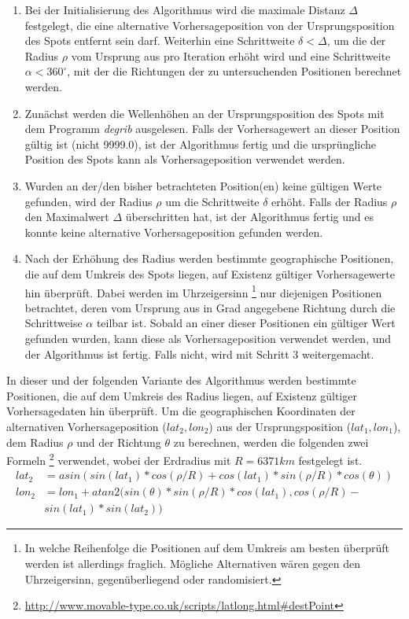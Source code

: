 \begin{enumerate}

\item Bei der Initialisierung des Algorithmus wird die maximale
  Distanz $\Delta$ festgelegt, die eine alternative Vorhersageposition
  von der Ursprungsposition des Spots entfernt sein darf. Weiterhin
  eine Schrittweite $\delta < \Delta$, um die der Radius $\rho$ vom
  Ursprung aus pro Iteration erhöht wird und eine Schrittweite $\alpha
  < 360^{\circ}$, mit der die Richtungen der zu untersuchenden
  Positionen berechnet werden.

\item Zunächst werden die Wellenhöhen an der Ursprungsposition des
  Spots mit dem Programm \textit{degrib} ausgelesen. Falls der
  Vorhersagewert an dieser Position gültig ist (nicht 9999.0), ist der
  Algorithmus fertig und die ursprüngliche Position des Spots kann als
  Vorhersageposition verwendet werden.

\item Wurden an der/den bisher betrachteten Position(en) keine
  gültigen Werte gefunden, wird der Radius $\rho$ um die Schrittweite
  $\delta$ erhöht. Falls der Radius $\rho$ den Maximalwert $\Delta$
  überschritten hat, ist der Algorithmus fertig und es konnte keine
  alternative Vorhersageposition gefunden werden.

\item Nach der Erhöhung des Radius werden bestimmte geographische
  Positionen, die auf dem Umkreis des Spots liegen, auf Existenz
  gültiger Vorhersagewerte hin überprüft. Dabei werden im
  Uhrzeigersinn \footnote{In welche Reihenfolge die Positionen auf dem
    Umkreis am besten überprüft werden ist allerdings
    fraglich. Mögliche Alternativen wären gegen den Uhrzeigersinn,
    gegenüberliegend oder randomisiert.} nur diejenigen Positionen
  betrachtet, deren vom Ursprung aus in Grad angegebene Richtung durch
  die Schrittweise $\alpha$ teilbar ist. Sobald an einer dieser
  Positionen ein gültiger Wert gefunden wurden, kann diese als
  Vorhersageposition verwendet werden, und der Algorithmus ist
  fertig. Falls nicht, wird mit Schritt 3 weitergemacht.

\end{enumerate}

In dieser und der folgenden Variante des Algorithmus werden bestimmte
Positionen, die auf dem Umkreis des Radius liegen, auf Existenz
gültiger Vorhersagedaten hin überprüft. Um die geographischen
Koordinaten der alternativen Vorhersageposition ($lat_2,lon_2$) aus
der Ursprungsposition ($lat_1,lon_1$), dem Radius $\rho$ und der
Richtung $\theta$ zu berechnen, werden die folgenden zwei Formeln
\footnote{\url{http://www.movable-type.co.uk/scripts/latlong.html\#destPoint}}
verwendet, wobei der Erdradius mit $R = 6371 km$ festgelegt ist.
\begin{align*}
  lat_2 & = asin(sin(lat_1)*cos(\rho/R) + cos(lat_1)*sin(\rho/R)*cos(\theta)) \\
  lon_2 & = lon_1 + atan2(sin(\theta)*sin(\rho/R)*cos(lat_1), cos(\rho/R)- \\ & sin(lat_1)*sin(lat_2))
\end{align*}

